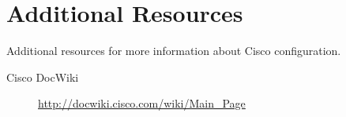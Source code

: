 \section{Additional Resources}
Additional resources for more information about Cisco configuration.
\begin{description}
  \item [Cisco DocWiki] \url{http://docwiki.cisco.com/wiki/Main_Page}
\end{description}
